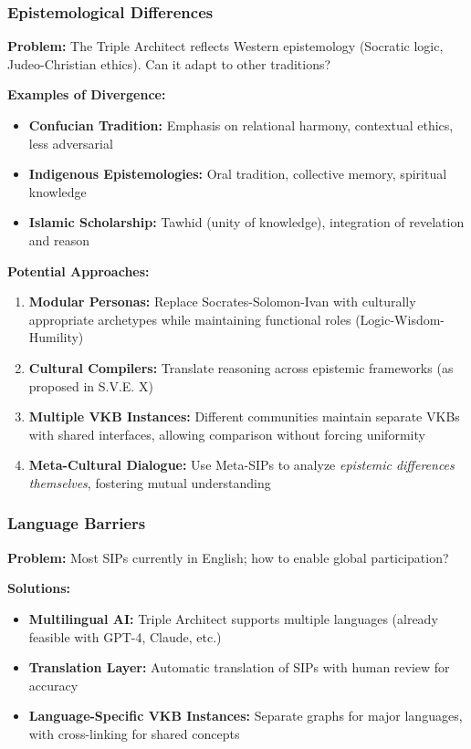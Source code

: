 \documentclass[11pt,a4paper]{article}
\theoremstyle{definition}
\theoremstyle{remark}
\newcommand{\VKB}{\textsc{VKB}}
\newcommand{\SIP}{\textsc{SIP}}
\begin{document}
\subsubsection{Epistemological Differences}

\textbf{Problem:} The Triple Architect reflects Western epistemology (Socratic logic, Judeo-Christian ethics). Can it adapt to other traditions?

\textbf{Examples of Divergence:}
\begin{itemize}
    \item \textbf{Confucian Tradition:} Emphasis on relational harmony, contextual ethics, less adversarial
    \item \textbf{Indigenous Epistemologies:} Oral tradition, collective memory, spiritual knowledge
    \item \textbf{Islamic Scholarship:} Tawhid (unity of knowledge), integration of revelation and reason
\end{itemize}

\textbf{Potential Approaches:}
\begin{enumerate}
    \item \textbf{Modular Personas:} Replace Socrates-Solomon-Ivan with culturally appropriate archetypes while maintaining functional roles (Logic-Wisdom-Humility)
    \item \textbf{Cultural Compilers:} Translate reasoning across epistemic frameworks (as proposed in S.V.E. X)
    \item \textbf{Multiple \VKB{} Instances:} Different communities maintain separate \VKB{}s with shared interfaces, allowing comparison without forcing uniformity
    \item \textbf{Meta-Cultural Dialogue:} Use Meta-\SIP{}s to analyze \textit{epistemic differences themselves}, fostering mutual understanding
\end{enumerate}

\subsubsection{Language Barriers}

\textbf{Problem:} Most \SIP{}s currently in English; how to enable global participation?

\textbf{Solutions:}
\begin{itemize}
    \item \textbf{Multilingual AI:} Triple Architect supports multiple languages (already feasible with GPT-4, Claude, etc.)
    \item \textbf{Translation Layer:} Automatic translation of \SIP{}s with human review for accuracy
    \item \textbf{Language-Specific \VKB{} Instances:} Separate graphs for major languages, with cross-linking for shared concepts
\end{itemize}
\end{document}
